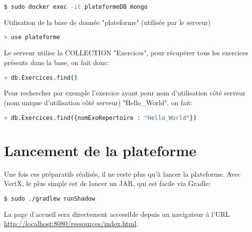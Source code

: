 \documentclass[a4paper]{article}
\begin{document}
\begin{lstlisting}[language=bash]
 $ sudo docker exec -it plateformeDB mongo
\end{lstlisting}
Utilisation de la base de donnée "plateforme" (utilisée par le serveur)
\begin{lstlisting}[language=bash]
  > use plateforme
\end{lstlisting}
Le serveur utilise la COLLECTION "Exercices", pour récupérer tous les exercices présents dans la base, on fait donc:
\begin{lstlisting}[language=bash]
  > db.Exercices.find()
\end{lstlisting}
Pour rechercher par exemple l'exercice ayant pour nom d'utilisation côté serveur (nom unique d'utilisation côté serveur) "Hello\_World", on fait:
\begin{lstlisting}[language=bash]
  > db.Exercices.find({nomExoRepertoire : "Hello_World"})
\end{lstlisting}

\section{Lancement de la plateforme}
Une fois ces préparatifs réalisés, il ne reste plus qu'à lancer la plateforme. Avec VertX, le plus simple est de lancer un JAR, qui est facile via Gradle:
\begin{lstlisting}[language=bash]
  $ sudo ./gradlew runShadow
\end{lstlisting}
La page d'accueil sera directement accessible depuis un navigateur à l'URL \url{http://localhost:8080/ressources/index.html}.
\end{document}
